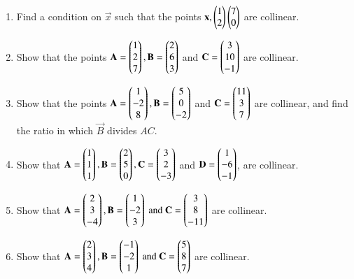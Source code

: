 \begin{enumerate}[label=\arabic*.,ref=\thesubsection.\theenumi]
\begin{enumerate}
\item {},  ,   
\item {},  ,   
\end{enumerate}
\item Find a condition on $\vec{x}$  such that the points $\mathbf{x}, \begin{pmatrix}1\\2\end{pmatrix}\begin{pmatrix}7\\0\end{pmatrix}$ are collinear.
\item Show that the points 
$\mathbf{A}=\begin{pmatrix}1\\2\\7\end{pmatrix}, \mathbf{B}=\begin{pmatrix}2\\6\\3\end{pmatrix}$ and $ \mathbf{C}=\begin{pmatrix}3\\10\\-1\end{pmatrix}$ are collinear.
\item Show that the points 
$\mathbf{A}=\begin{pmatrix}1\\-2\\8\end{pmatrix}, \mathbf{B}=\begin{pmatrix}5\\0\\-2\end{pmatrix}$ and $ \mathbf{C}=\begin{pmatrix}11\\3\\7\end{pmatrix}$ are collinear, and find the ratio in which $\vec{B}$ divides $AC$.
\item Show that 
$\mathbf{A}=\begin{pmatrix}1\\1\\1\end{pmatrix}, \mathbf{B}=\begin{pmatrix}2\\5\\0\end{pmatrix}, \mathbf{C}=\begin{pmatrix}3\\2\\-3\end{pmatrix}$  and $ \mathbf{D}=\begin{pmatrix}1\\-6\\-1\end{pmatrix}$, are collinear.
\item Show that 
$
\mathbf{A}=\begin{pmatrix}2\\3\\-4\end{pmatrix}, 
\mathbf{B}=\begin{pmatrix}1\\-2\\3\end{pmatrix} \text{ and } 
\mathbf{C}=\begin{pmatrix}3\\8\\-11\end{pmatrix}$  
are collinear.
\item Show that 
$
\mathbf{A}=\begin{pmatrix}2\\3\\4\end{pmatrix}, 
\mathbf{B}=\begin{pmatrix}-1\\-2\\1\end{pmatrix} \text{ and } 
\mathbf{C}=\begin{pmatrix}5\\8\\7\end{pmatrix}$  
are collinear.
\end{enumerate}
%
